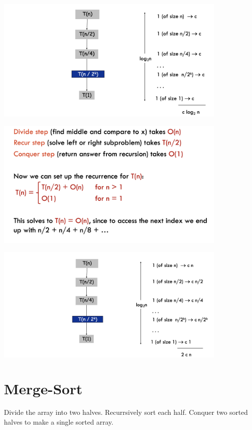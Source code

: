 \documentclass[12pt]{article}
\newcommand{\1}{\space \quad}
\newcommand{\2}{\quad \quad \quad}
\newcommand{\3}{\quad \quad \quad \quad \space}
\newcommand{\4}{\quad \quad \quad \quad \quad \quad}
\newcommand{\5}{\quad \quad \quad \quad \quad \quad \quad \space}
\begin{document}
\begin{center}
  \includegraphics[width=0.85\textwidth]{image30.png} 

  \includegraphics[width=0.85\textwidth]{image31.png} 

  \includegraphics[width=0.85\textwidth]{image32.png} 
\end{center}

\section{Merge-Sort}
Divide the array into two halves. Recurrsively sort each half. Conquer two sorted halves to make a single 
sorted array.
\end{document}
